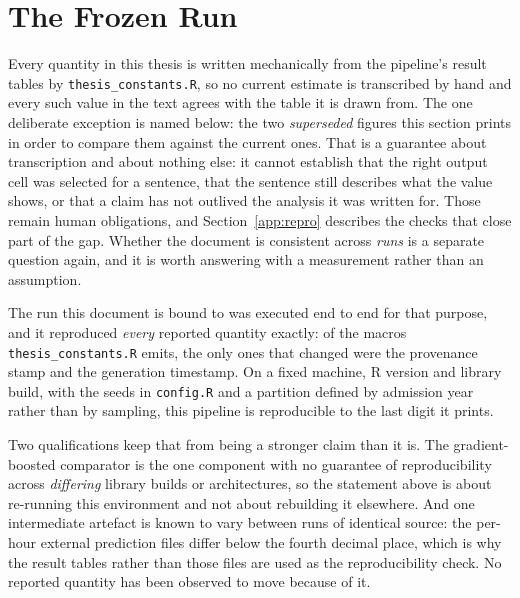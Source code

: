 \section{The Frozen Run}
\label{app:frozen_run}

Every quantity in this thesis is written mechanically from the pipeline's result
tables by \texttt{thesis\_constants.R}, so no current estimate is transcribed by
hand and every such value in the text agrees with the table it is drawn from.
The one deliberate exception is named below: the two \emph{superseded} figures
this section prints in order to compare them against the current ones. That is
a guarantee about transcription and about nothing else: it cannot establish that
the right output cell was selected for a sentence, that the sentence still
describes what the value shows, or that a claim has not outlived the analysis it
was written for. Those remain human obligations, and
Section~\ref{app:repro} describes the checks that close part of the gap.
Whether the document is consistent across \emph{runs} is a separate question
again, and it is worth answering with a measurement rather than an assumption.

The run this document is bound to was executed end to end for that purpose, and
it reproduced \emph{every} reported quantity exactly: of the macros
\texttt{thesis\_constants.R} emits, the only ones that changed were the
provenance stamp and the generation timestamp. On a fixed machine, R version and
library build, with the seeds in \texttt{config.R} and a partition defined by
admission year rather than by sampling, this pipeline is reproducible to the
last digit it prints.

Two qualifications keep that from being a stronger claim than it is. The
gradient-boosted comparator is the one component with no guarantee of
reproducibility across \emph{differing} library builds or architectures, so the
statement above is about re-running this environment and not about rebuilding it
elsewhere. And one intermediate artefact is known to vary between runs of
identical source: the per-hour external prediction files differ below the fourth
decimal place, which is why the result tables rather than those files are used as
the reproducibility check. No reported quantity has been observed to move because
of it.

